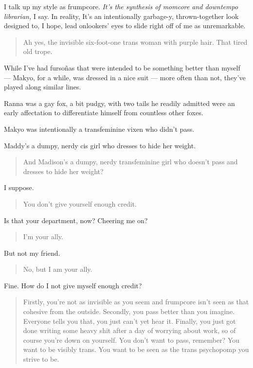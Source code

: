 I talk up my style as frumpcore. \emph{It's the synthesis of momcore and downtempo librarian,} I say. In reality, It's an intentionally garbage-y, thrown-together look designed to, I hope, lead onlookers' eyes to slide right off of me as unremarkable.

\begin{quote}
Ah yes, the invisible six-foot-one trans woman with purple hair. That tired old trope.
\end{quote}

While I've had fursoñas that were intended to be something better than myself --- Makyo, for a while, was dressed in a nice suit --- more often than not, they've played along similar lines.

Ranna was a gay fox, a bit pudgy, with two tails he readily admitted were an early affectation to differentiate himself from countless other foxes.

Makyo was intentionally a transfeminine vixen who didn't pass.

Maddy's a dumpy, nerdy cis girl who dresses to hide her weight.

\begin{quote}
And Madison's a dumpy, nerdy transfeminine girl who doesn't pass and dresses to hide her weight?
\end{quote}

I suppose.

\begin{quote}
You don't give yourself enough credit.
\end{quote}

Is that your department, now? Cheering me on?

\begin{quote}
I'm your ally.
\end{quote}

But not my friend.

\begin{quote}
No, but I am your ally.
\end{quote}

Fine. How do I not give myself enough credit?

\begin{quote}
Firstly, you're not as invisible as you seem and frumpcore isn't seen as that cohesive from the outside. Secondly, you pass better than you imagine. Everyone tells you that, you just can't yet hear it. Finally, you just got done writing some heavy shit after a day of worrying about work, so of course you're down on yourself. You don't want to pass, remember? You want to be visibly trans. You want to be seen as the trans psychopomp you strive to be.
\end{quote}

